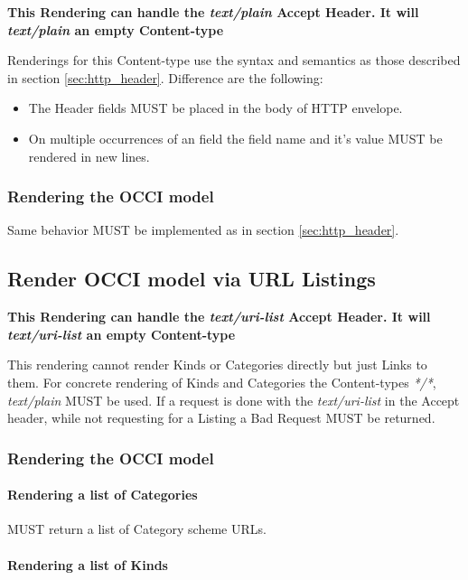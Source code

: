 \documentclass[10pt,a4paper]{article}
\begin{document}
\textbf{This Rendering can handle the \textit{text/plain} Accept Header. It will \textit{text/plain} an empty Content-type}

Renderings for this Content-type use the syntax and semantics as those described in section \ref{sec:http_header}. Difference are the following:

\begin{itemize}
  \item The Header fields MUST be placed in the body of HTTP envelope.
  \item On multiple occurrences of an field the field name and it's value MUST be rendered in new lines.
\end{itemize}

\subsubsection{Rendering the OCCI model}

Same behavior MUST be implemented as in section \ref{sec:http_header}.

\subsection{Render OCCI model via URL Listings}

\textbf{This Rendering can handle the \textit{text/uri-list} Accept Header. It will \textit{text/uri-list} an empty Content-type}

This rendering cannot render Kinds or Categories directly but just Links to them. For concrete rendering of Kinds and Categories the Content-types \textit{*/*}, \textit{text/plain} MUST be used. If a request is done with the \textit{text/uri-list} in the Accept header, while not requesting for a Listing a Bad Request MUST be returned.

\subsubsection{Rendering the OCCI model}

\paragraph{Rendering a list of Categories}

MUST return a list of Category scheme URLs.

\paragraph{Rendering a list of Kinds}
\end{document}
